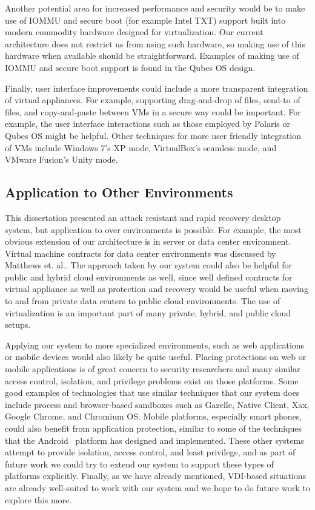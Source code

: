 Another potential area for increased performance and security would be to make use of IOMMU and secure boot (for example Intel TXT) support built into modern commodity hardware designed for virtualization. Our current architecture does not restrict us from using such hardware, so making use of this hardware when available should be straightforward. Examples of making use of IOMMU and secure boot support is found in the Qubes OS design. 

Finally, user interface improvements could include a more transparent integration of virtual appliances. For example, supporting drag-and-drop of files, send-to of files, and copy-and-paste between VMs in a secure way could be important. For example, the user interface interactions such as those employed by Polaris\cite{stiegler_2006} or Qubes OS might be helpful. Other techniques for more user friendly integration of VMs include Windows 7's XP mode, VirtualBox's seamless mode, and VMware Fusion's Unity mode.

\subsection{Application to Other Environments}
\label{sec:fw-other-environments}

This dissertation presented an attack resistant and rapid recovery desktop system, but application to over environments is possible. For example, the most obvious extension of our architecture is in server or data center environment. Virtual machine contracts for data center environments was discussed by Matthews et. al.\cite{virtual_machine_contract_ICAC09}. The approach taken by our system could also be helpful for public and hybrid cloud environments as well, since well defined contracts for virtual appliance as well as protection and recovery would be useful when moving to and from private data centers to public cloud environments. The use of virtualization is an important part of many private, hybrid, and public cloud setups.

Applying our system to more specialized environments, such as web applications or mobile devices would also likely be quite useful. Placing protections on web or mobile applications is of great concern to security researchers and many similar access control, isolation, and privilege problems exist on those platforms. Some good examples of technologies that use similar techniques that our system does include process and browser-based sandboxes such as Gazelle\cite{grier_gazelle_2009}, Native Client\cite{yee_nacl_2009}, Xax\cite{douceur_xax_2008}, Google Chrome\cite{reis_2009}, and Chromium OS\cite{chromium_os_security_overview_website}. Mobile platforms, especially smart phones, could also benefit from application protection, similar to some of the techniques that the Android~\cite{canning_android_keynote_2009,android_security_dev} platform has designed and implemented. These other systems attempt to provide isolation, access control, and least privilege, and as part of future work we could try to extend our system to support these types of platforms explicitly. Finally, as we have already mentioned, VDI-based situations are already well-suited to work with our system and we hope to do future work to explore this more.

